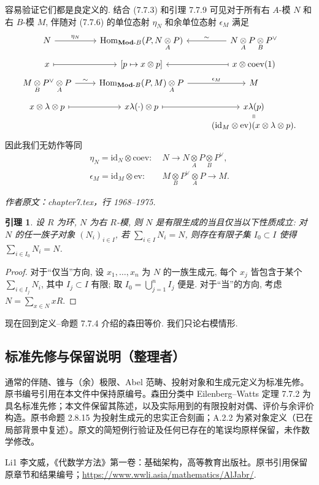 \documentclass[11pt]{article}
\newcommand{\identity}{\mathrm{id}}
\newcommand{\Hom}{\operatorname{Hom}}
\newcommand{\cated}[1]{\mathbf{#1}\text{-}}
\newcommand{\dotimes}[1]{\mathbin{\mathop{\otimes}\limits_{#1}}}
\newcommand{\CorpusNumber}{0}
\newtheorem{lemma}[theorem]{引理}
\theoremstyle{definition}
\begin{document}
容易验证它们都是良定义的. 结合 (7.7.3) 和引理 7.7.9 可见对于所有右 $A$-模 $N$ 和右 $B$-模 $M$, 伴随对 (7.7.6) 的单位态射 $\eta_N$ 和余单位态射 $\epsilon_M$ 满足
\[\begin{tikzcd}[row sep=tiny]
	N \arrow[r, "\eta_N"] & \Hom_{\cated{Mod}B}(P, N \dotimes{A} P) & N \dotimes{A} P \dotimes{B} P^\vee \arrow[l, "\sim"'] \\
	x \arrow[mapsto, r] & {[p \mapsto x \otimes p]} & x \otimes \mathrm{coev}(1) \arrow[mapsto, l] \\
	M \dotimes{B} P^\vee \dotimes{A} P \arrow[r, "\sim"] & \Hom_{\cated{Mod}B}(P, M) \dotimes{A} P \arrow[r, "\epsilon_M"] & M \\
	x \otimes \lambda \otimes p \arrow[mapsto, r] & x \lambda(\cdot) \otimes p \arrow[mapsto, r] & x\lambda(p) \arrow[equal, d] \\
	& & (\identity_M \otimes \mathrm{ev})(x \otimes \lambda \otimes p).
\end{tikzcd}\]
因此我们无妨作等同
\begin{align*}
	\eta_N = \identity_N \otimes \mathrm{coev}: \; & N \to N \dotimes{A} P \dotimes{B} P^\vee , \\
	\epsilon_M = \identity_M \otimes \mathrm{ev}: \; & M \dotimes{B} P^\vee \dotimes{A} P \to M.
\end{align*}
\par\medskip\noindent\textit{作者原文：chapter7.tex，行 1968--1975.}\par
\def\CorpusNumber{7.7.15}
\begin{lemma}\label{prop:fg-module-cat}
	设 $R$ 为环, $N$ 为右 $R$-模, 则 $N$ 是有限生成的当且仅当以下性质成立: 对 $N$ 的任一族子对象 $(N_i)_{i \in I}$, 若 $\sum_{i \in I} N_i = N$, 则存在有限子集 $I_0 \subset I$ 使得 $\sum_{i \in I_0} N_i = N$.
\end{lemma}
\begin{proof}
	对于``仅当''方向, 设 $x_1, \ldots, x_n$ 为 $N$ 的一族生成元, 每个 $x_j$ 皆包含于某个 $\sum_{i \in I_j} N_i$, 其中 $I_j \subset I$ 有限; 取 $I_0 = \bigcup_{j=1}^n I_j$ 便是. 对于``当''的方向, 考虑 $N = \sum_{x \in N} xR$.
\end{proof}

现在回到定义--命题 7.7.4 介绍的森田等价. 我们只论右模情形.
\subsection*{标准先修与保留说明（整理者）}
通常的伴随、锥与（余）极限、Abel 范畴、投射对象和生成元定义为标准先修。原书编号引用在本文件中保持原编号。森田分类中 Eilenberg--Watts 定理 7.7.2 为具名标准先修；本文件保留其陈述，以及实际用到的有限投射对偶、评价与余评价构造。原书命题 2.8.15 为投射生成元的忠实正合刻画；A.2.2 为紧对象定义（已在局部背景中复述）。原文的简短例行验证及任何已存在的笔误均原样保留，未作数学修改。
\begin{thebibliography}{Li1}
 李文威，《代数学方法》第一卷：基础架构，高等教育出版社。原书引用保留原章节和结果编号；\url{https://www.wwli.asia/mathematics/AlJabr/}.
\end{thebibliography}
\end{document}
